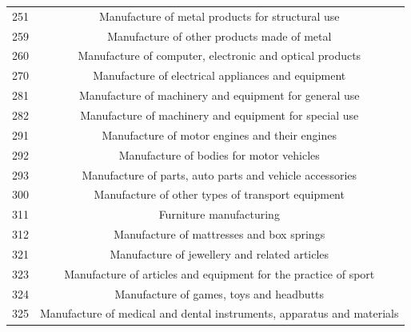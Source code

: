 \documentclass[12pt,a4paper]{article}
\begin{document}
{\begin{longtable}{@{}lc@{}}
	251                                            & Manufacture of metal products   for structural use                       \\
	259                                            & Manufacture of other products   made of metal                            \\
	260                                            & Manufacture of computer,   electronic and optical products               \\
	270                                            & Manufacture of electrical   appliances and equipment                     \\
	281                                            & Manufacture of machinery and   equipment for general use                 \\
	282                                            & Manufacture of machinery and   equipment for special use                 \\
	291                                            & Manufacture of motor engines and   their engines                         \\
	292                                            & Manufacture of bodies for motor   vehicles                               \\
	293                                            & Manufacture of parts, auto parts   and vehicle accessories               \\
	300                                            & Manufacture of other types of   transport equipment                      \\
	311                                            & Furniture manufacturing                                                  \\
	312                                            & Manufacture of mattresses and   box springs                              \\
	321                                            & Manufacture of jewellery and   related articles                          \\
	323                                            & Manufacture of articles and   equipment for the practice of sport        \\
	324                                            & Manufacture of games, toys and   headbutts                               \\
	325                                            & Manufacture of medical and   dental instruments, apparatus and materials \\

\end{longtable}}
\end{document}
